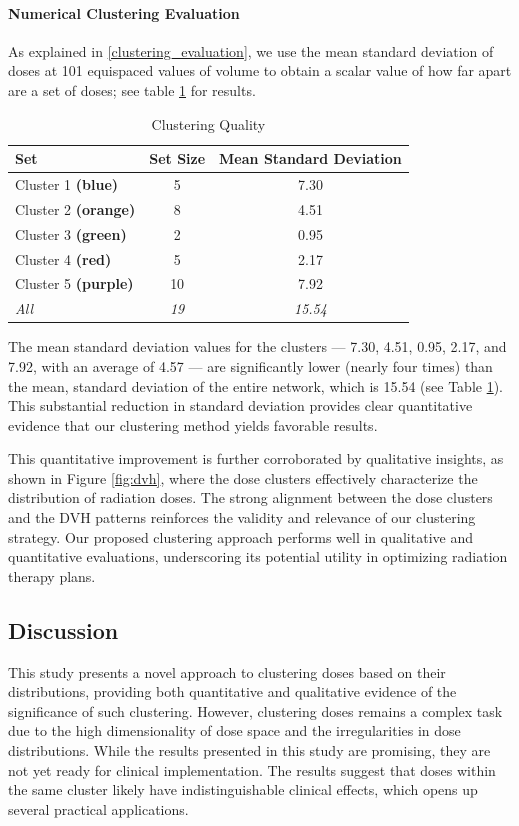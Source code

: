 \paragraph{Numerical Clustering Evaluation}
As explained in \ref{clustering_evaluation}, we use the mean standard deviation of doses at 101 equispaced values of volume to obtain a scalar value of how far apart are a set of doses; see table \ref{table:cluster_std} for results.

\begin{table}
	\centering
	\begin{tabular}{|l|c|c|}
		\hline
		Set & Set Size & Mean Standard Deviation \\
		\hline
		Cluster 1 \textcolor{plt-blue}  {\textbf{(blue)}}   & 5  & 7.30 \\
		Cluster 2 \textcolor{plt-orange}{\textbf{(orange)}} & 8  & 4.51 \\
		Cluster 3 \textcolor{plt-green} {\textbf{(green)}}  & 2  & 0.95 \\
		Cluster 4 \textcolor{plt-red}   {\textbf{(red)}}    & 5  & 2.17 \\
		Cluster 5 \textcolor{plt-purple}{\textbf{(purple)}} & 10 & 7.92 \\
		\textit{All} & \textit{19} & \textit{15.54} \\
		\hline
	\end{tabular}
	\caption{Clustering Quality}
	\label{table:cluster_std}
\end{table}

The mean standard deviation values for the clusters — 7.30, 4.51, 0.95, 2.17, and 7.92, with an average of 4.57 — are significantly lower (nearly four times) than the mean, standard deviation of the entire network, which is 15.54 (see Table \ref{table:cluster_std}).
This substantial reduction in standard deviation provides clear quantitative evidence that our clustering method yields favorable results. 

This quantitative improvement is further corroborated by qualitative insights, as shown in Figure \ref{fig:dvh}, where the dose clusters effectively characterize the distribution of radiation doses.
The strong alignment between the dose clusters and the DVH patterns reinforces the validity and relevance of our clustering strategy.
Our proposed clustering approach performs well in qualitative and quantitative evaluations, underscoring its potential utility in optimizing radiation therapy plans.

\subsection{Discussion}
This study presents a novel approach to clustering doses based on their distributions, providing both quantitative and qualitative evidence of the significance of such clustering.
However, clustering doses remains a complex task due to the high dimensionality of dose space and the irregularities in dose distributions.
While the results presented in this study are promising, they are not yet ready for clinical implementation.
The results suggest that doses within the same cluster likely have indistinguishable clinical effects, which opens up several practical applications.

